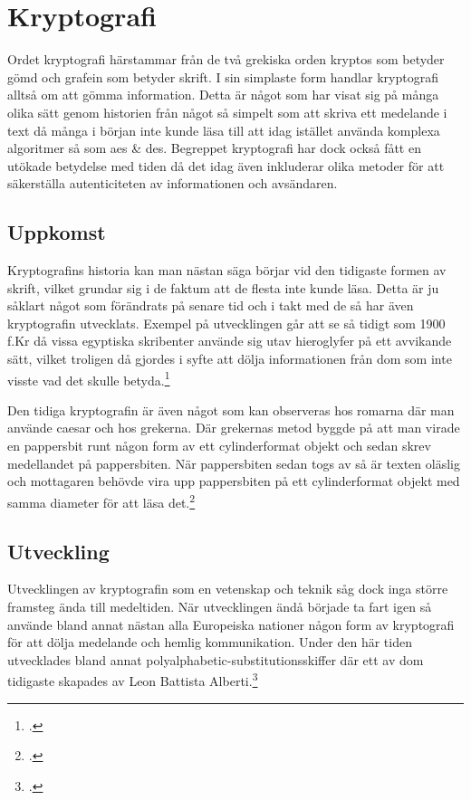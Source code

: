 
\section{Kryptografi} %
Ordet kryptografi härstammar från de två grekiska orden
kryptos som betyder gömd och grafein som betyder skrift.
I sin simplaste form handlar kryptografi alltså om att
gömma information. Detta är något som har visat sig på många
olika sätt genom historien från något så simpelt som att skriva
ett medelande i text då många i början inte kunde läsa till
att idag istället använda komplexa algoritmer så som \acrshort{aes} \& \acrshort{des}.
Begreppet kryptografi har dock också fått en utökade betydelse
med tiden då det idag även inkluderar olika metoder för att
säkerställa autenticiteten av informationen och avsändaren.

\subsection{Uppkomst} %
Kryptografins historia kan man nästan säga börjar vid den
tidigaste formen av skrift, vilket grundar sig i de faktum att
de flesta inte kunde läsa. Detta är ju såklart något som förändrats
på senare tid och i takt med de så har även kryptografin utvecklats.
Exempel på utvecklingen går att se så tidigt som 1900 f.Kr då vissa egyptiska
skribenter använde sig utav hieroglyfer på ett avvikande sätt, vilket
troligen då gjordes i syfte att dölja informationen från dom som inte
visste vad det skulle betyda.\footcite{kryptografi-historia-1}

Den tidiga kryptografin är även något som kan observeras hos romarna där
man använde \gls{caesar} och hos grekerna. Där grekernas metod byggde på
att man virade en pappersbit runt någon form av ett cylinderformat objekt
och sedan skrev medellandet på pappersbiten. När pappersbiten sedan togs av så är texten %
oläslig och mottagaren behövde vira upp pappersbiten på ett cylinderformat objekt
med samma diameter för att läsa det.\footcite{kryptografi-historia-1}

\subsection{Utveckling} %
Utvecklingen av kryptografin som en vetenskap och teknik såg dock inga större framsteg
ända till medeltiden. När utvecklingen ändå började ta fart igen så använde bland annat
nästan alla Europeiska nationer någon form av kryptografi för att dölja medelande och hemlig kommunikation.
Under den här tiden utvecklades bland annat \gls{polyalphabetic-substitutionsskiffer} där ett av dom tidigaste skapades av
Leon Battista Alberti.\footcite{kryptografi-historia-1}

